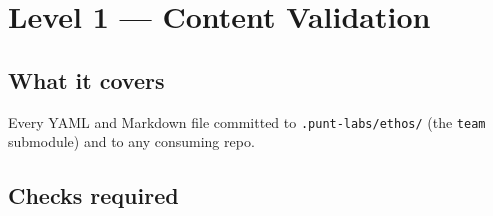 \documentclass[a4paper,10pt]{article}
\newcommand{\fpath}[1]{\texttt{#1}}
\begin{document}
\section{Level 1 --- Content Validation}

\subsection*{What it covers}

Every YAML and Markdown file committed to \fpath{.punt-labs/ethos/}
(the \texttt{team} submodule) and to any consuming repo.

\subsection*{Checks required}
\end{document}
